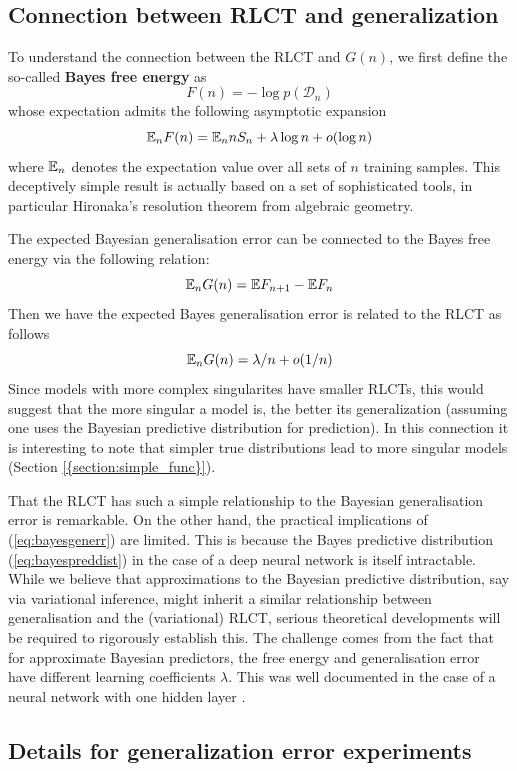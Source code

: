 \documentclass{article} %
\begin{document}
\subsection{Connection between RLCT and generalization}
To understand the connection between the RLCT and $G(n)$, we first define the so-called \textbf{Bayes free energy} as 
\[
F(n) = -\log p(\mathcal D_n)
\]
whose expectation admits the following asymptotic expansion \cite{watanabe_algebraic_2009}
\[
{\mathbb{E}}_n F(n) =  {\mathbb{E}}_n n S_n + \lambda \log n + o(\log n)
\]
where ${\mathbb{E}}_n$ denotes the expectation value over all sets of $n$ training samples. This deceptively simple result is actually based on a set of sophisticated tools, in particular Hironaka's resolution theorem from algebraic geometry.

The expected Bayesian generalisation error can be connected to the Bayes free energy via the following relation:
\[
{\mathbb{E}}_n G(n) = \mathbb{E} F_{n+1} - \mathbb{E} F_n 
\]
Then we have the expected Bayes generalisation error is related to the RLCT as follows
\begin{equation}
{\mathbb{E}}_n G(n) = \lambda/n + o(1/n)
\label{eq:bayesgenerr}
\end{equation}
Since models with more complex singularites have smaller RLCTs, this would suggest that the more singular a model is, the better its generalization (assuming one uses the Bayesian predictive distribution for prediction). In this connection it is interesting to note that simpler true distributions lead to more singular models (Section \ref{{section:simple_func}}).

That the RLCT has such a simple relationship to the Bayesian generalisation error is remarkable. On the other hand, the practical implications of (\ref{eq:bayesgenerr}) are limited. This is because the Bayes predictive distribution (\ref{eq:bayespreddist}) in the case of a deep neural network is itself intractable. While we believe that approximations to the Bayesian predictive distribution, say via variational inference, might inherit a similar relationship between generalisation and the (variational) RLCT, serious theoretical developments will be required to rigorously establish this. The challenge comes from the fact that for approximate Bayesian predictors, the free energy and generalisation error have different learning coefficients $\lambda$. This was well documented in the case of a neural network with one hidden layer \citep{nakajima_variational_2007}. 

\subsection{Details for generalization error experiments}
\end{document}
